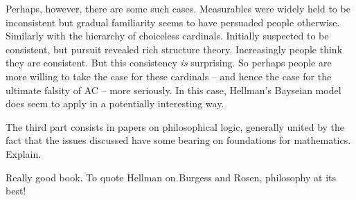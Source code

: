 \documentclass{asl}
\theoremstyle{definition}
\begin{document}
Perhaps, however, there are some such cases. Measurables were widely held to be inconsistent but gradual familiarity seems to have persuaded people otherwise. Similarly with the hierarchy of choiceless cardinals. Initially suspected to be consistent, but pursuit revealed rich structure theory. Increasingly people think they are consistent. But this consistency \emph{is} surprising. So perhaps people are more willing to take the case for these cardinals -- and hence the case for the ultimate falsity of AC -- more seriously. In this case, Hellman's Bayseian model does seem to apply in a potentially interesting way.



The third part consists in papers on philosophical logic, generally united by the fact that the issues discussed have some bearing on foundations for mathematics. Explain.

Really good book. To quote Hellman on Burgess and Rosen, philosophy at its best!






\end{document}
